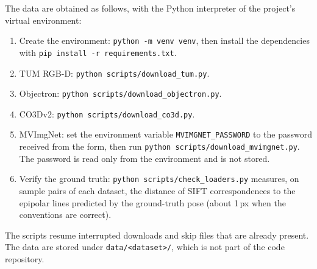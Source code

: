 \documentclass[10pt,a4paper,twocolumn]{article}
\begin{document}
The data are obtained as follows, with the Python interpreter of the project's virtual environment:
\begin{enumerate}
  \item Create the environment: \texttt{python -m venv venv}, then install the dependencies with \texttt{pip install -r requirements.txt}.
  \item TUM RGB-D: \texttt{python scripts/download\_tum.py}.
  \item Objectron: \texttt{python scripts/download\_objectron.py}.
  \item CO3Dv2: \texttt{python scripts/download\_co3d.py}.
  \item MVImgNet: set the environment variable \texttt{MVIMGNET\_PASSWORD} to the password received from the form, then run \texttt{python scripts/download\_mvimgnet.py}. The password is read only from the environment and is not stored.
  \item Verify the ground truth: \texttt{python scripts/check\_loaders.py} measures, on sample pairs of each dataset, the distance of SIFT correspondences to the epipolar lines predicted by the ground-truth pose (about 1\,px when the conventions are correct).
\end{enumerate}
The scripts resume interrupted downloads and skip files that are already present. The data are stored under \texttt{data/<dataset>/}, which is not part of the code repository.
\end{document}

